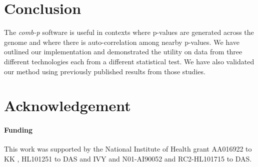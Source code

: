 \documentclass{bioinfo}
\begin{document}
\section{Conclusion}

The \textit{comb-p} software is useful in contexts where p-values are
generated across the genome and where there is auto-correlation among
nearby p-values. We have outlined our implementation and demonstrated
the utility on data from three different technologies each from a
different statistical test. We have also validated our method using
previously published results from those studies.

\section*{Acknowledgement}

\paragraph{Funding\textcolon}
This work was supported by the National Institute of Health grant AA016922 to KK
, HL101251 to DAS and IVY and N01-AI90052 and RC2-HL101715 to DAS.

%
%
%
%
%
%
%
\end{document}
